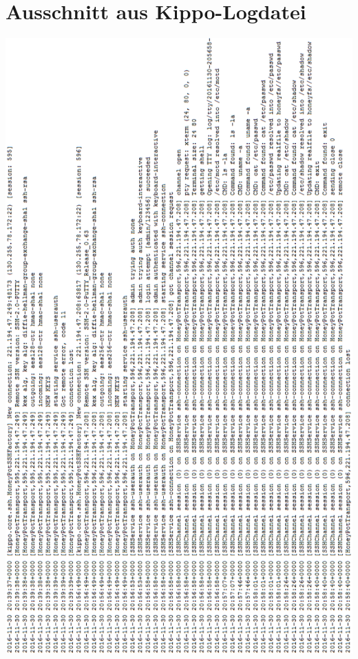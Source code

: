 \section*{Ausschnitt aus Kippo-Logdatei}
\label{app:Ausschnitt aus Kippo-Logdatei}

%

\begin{center}
\includegraphics[scale=0.62]{img/kippo_log.png}
\end{center}


